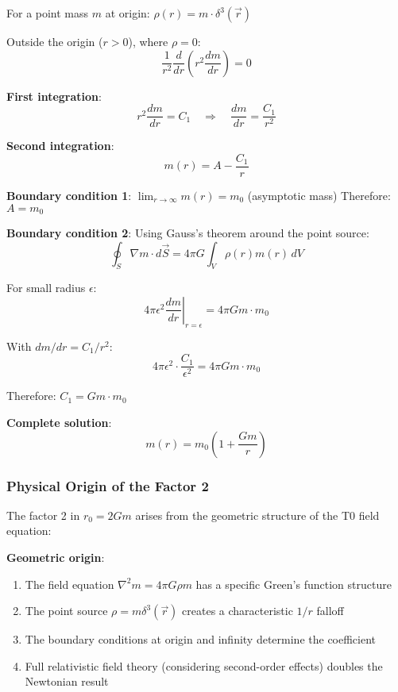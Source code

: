 \documentclass[12pt,a4paper]{article}
\begin{document}
For a point mass $m$ at origin: $\rho(r) = m \cdot \delta^3(\vec{r})$

Outside the origin ($r > 0$), where $\rho = 0$:
\begin{equation}
	\frac{1}{r^2}\frac{d}{dr}\left(r^2 \frac{dm}{dr}\right) = 0
\end{equation}

\textbf{First integration}:
\begin{equation}
	r^2 \frac{dm}{dr} = C_1 \quad \Rightarrow \quad \frac{dm}{dr} = \frac{C_1}{r^2}
\end{equation}

\textbf{Second integration}:
\begin{equation}
	m(r) = A - \frac{C_1}{r}
\end{equation}

\textbf{Boundary condition 1}: $\lim_{r \to \infty} m(r) = m_0$ (asymptotic mass)
Therefore: $A = m_0$

\textbf{Boundary condition 2}: Using Gauss's theorem around the point source:
\begin{equation}
	\oint_S \nabla m \cdot d\vec{S} = 4\pi G \int_V \rho(r) m(r) \, dV
\end{equation}

For small radius $\epsilon$:
\begin{equation}
	4\pi \epsilon^2 \left.\frac{dm}{dr}\right|_{r=\epsilon} = 4\pi G m \cdot m_0
\end{equation}

With $dm/dr = C_1/r^2$:
\begin{equation}
	4\pi \epsilon^2 \cdot \frac{C_1}{\epsilon^2} = 4\pi G m \cdot m_0
\end{equation}

Therefore: $C_1 = G m \cdot m_0$

\textbf{Complete solution}:
\begin{equation}
	m(r) = m_0\left(1 + \frac{Gm}{r}\right)
\end{equation}

\subsubsection{Physical Origin of the Factor 2}
\label{subsubsec:factor_2_origin}

The factor 2 in $r_0 = 2Gm$ arises from the geometric structure of the T0 field equation:

\textbf{Geometric origin}:
\begin{enumerate}
	\item The field equation $\nabla^2 m = 4\pi G \rho m$ has a specific Green's function structure
	\item The point source $\rho = m \delta^3(\vec{r})$ creates a characteristic $1/r$ falloff
	\item The boundary conditions at origin and infinity determine the coefficient
	\item Full relativistic field theory (considering second-order effects) doubles the Newtonian result
\end{enumerate}
\end{document}
